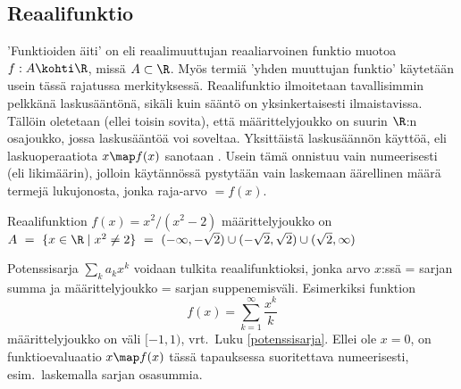 \subsection{Reaalifunktio}

'Funktioiden äiti' on  eli reaalimuuttujan reaaliarvoinen funktio muotoa
$f: A \kohti \R$, missä $A \subset \R$. Myös termiä 'yhden muuttujan funktio' käytetään usein 
tässä rajatussa merkityksessä. Reaalifunktio ilmoitetaan tavallisimmin pelkkänä laskusääntönä,
sikäli kuin sääntö on yksinkertaisesti ilmaistavissa. Tällöin oletetaan (ellei toisin sovita),
että määrittelyjoukko on suurin $\R$:n osa\-joukko, jossa laskusääntöä voi soveltaa.
Yksittäistä laskusäännön käyttöä, eli laskuoperaatiota $x \map f(x)$ sanotaan 
. Usein tämä onnistuu vain numeerisesti (eli likimäärin), 
jolloin käytännössä pystytään vain laskemaan äärellinen määrä termejä lukujonosta, jonka 
raja-arvo $=f(x)$.
\begin{Exa} Reaalifunktion $f(x)=x^2/(x^2-2)$ määrittelyjoukko on \newline
$A\ =\ \{x\in\R \mid x^2 \neq 2\}\ 
    =\ (-\infty,-\sqrt{2}) \cup (-\sqrt{2},\sqrt{2}) \cup (\sqrt{2},\infty)$ \loppu
\end{Exa}
\begin{Exa} Potenssisarja $\sum_k a_k x^k$ voidaan tulkita reaalifunktioksi, jonka arvo
$x$:ssä = sarjan summa ja määrittelyjoukko = sarjan suppenemisväli. Esimerkiksi funktion
\[
f(x)=\sum_{k=1}^\infty \frac{x^k}{k}
\]
määrittelyjoukko on väli $[-1,1)$, vrt.\ Luku \ref{potenssisarja}. Ellei ole $x=0$, on
funktioevaluaatio $x \map f(x)$ tässä tapauksessa suoritettava numeerisesti, esim.\ 
laskemalla sarjan osasummia. \loppu
\end{Exa}

